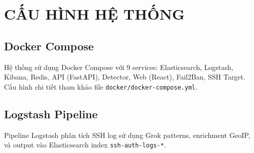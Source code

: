 \documentclass[13pt,a4paper,oneside]{report}
\begin{document}
\chapter{CẤU HÌNH HỆ THỐNG}

\section{Docker Compose}
Hệ thống sử dụng Docker Compose với 9 services: Elasticsearch, Logstash, Kibana, Redis, API (FastAPI), Detector, Web (React), Fail2Ban, SSH Target. Cấu hình chi tiết tham khảo file \texttt{docker/docker-compose.yml}.

\section{Logstash Pipeline}
Pipeline Logstash phân tích SSH log sử dụng Grok patterns, enrichment GeoIP, và output vào Elasticsearch index \texttt{ssh-auth-logs-*}.
\end{document}
